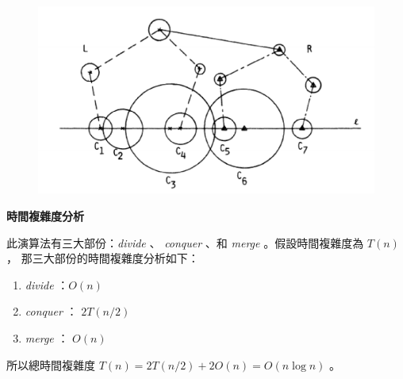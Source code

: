 \documentclass[12pt]{article}
\begin{document}
\begin{CJK}{UTF8}{bkai}
\begin{figure}[h]
\includegraphics[scale=0.4]{figure5(i).eps}
\caption{}
\end{figure}

\centerline{\bf 時間複雜度分析}

此演算法有三大部份：{\it divide} 、 {\it conquer} 、和 {\it merge} 。假設時間複雜度為 $T(n)$，
那三大部份的時間複雜度分析如下：\\

\begin{enumerate}
\item {\it divide} ：$O(n)$\\
\item {\it conquer} ： $2T(n/2)$\\
\item {\it merge} ： $O(n)$\\
\end{enumerate}

所以總時間複雜度 $T(n)=2T(n/2)+2O(n)=O(n\log n)$ 。

\end{CJK}
\end{document}
